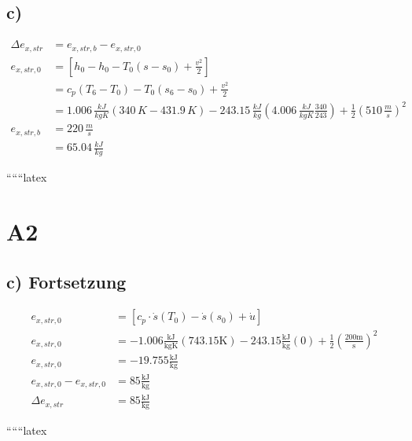 

\subsection*{c)}
\begin{align*}
    \Delta e_{x,str} &= e_{x,str,b} - e_{x,str,0} \\
    e_{x,str,0} &= \left[ h_0 - h_0 - T_0 (s - s_0) + \frac{v^2}{2} \right] \\
    &= c_p \left( T_6 - T_0 \right) - T_0 (s_6 - s_0) + \frac{v^2}{2} \\
    &= 1.006 \, \frac{kJ}{kg K} (340 \, K - 431.9 \, K) - 243.15 \, \frac{kJ}{kg} \left( 4.006 \, \frac{kJ}{kg K} \frac{340}{243} \right) + \frac{1}{2} \left( 510 \, \frac{m}{s} \right)^2 \\
    e_{x,str,b} &= 220 \, \frac{m}{s} \\
    &= 65.04 \, \frac{kJ}{kg}
\end{align*}

``````latex

\section*{A2}

\subsection*{c) Fortsetzung}

\begin{align*}
    e_{x, str, 0} &= \left[ c_p \cdot \dot{s}(T_0) - \dot{s}(s_0) + \dot{u} \right] \\
    e_{x, str, 0} &= -1.006 \frac{\text{kJ}}{\text{kgK}} (743.15 \text{K}) - 243.15 \frac{\text{kJ}}{\text{kg}} (0) + \frac{1}{2} \left( \frac{200 \text{m}}{\text{s}} \right)^2 \\
    e_{x, str, 0} &= -19.755 \frac{\text{kJ}}{\text{kg}} \\
    e_{x, str, 0} - e_{x, str, 0} &= 85 \frac{\text{kJ}}{\text{kg}} \\
    \Delta e_{x, str} &= 85 \frac{\text{kJ}}{\text{kg}}
\end{align*}

``````latex